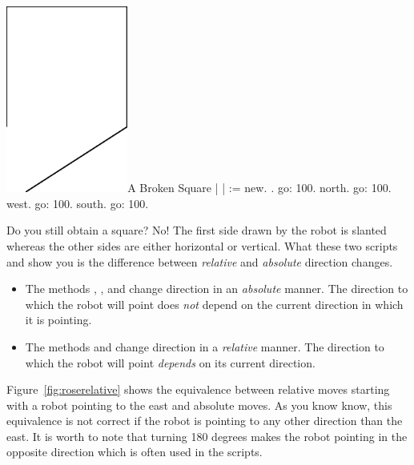 \begin{scriptfigwithsize}{\includegraphics[width=4cm]{ChTurnbadSquare}}{A Broken Square} \label{scr:badSquare}
| \caro |
\caro := \Turtle new.
\textit{\caro {}.}
\caro go: 100.
\caro north.
\caro go: 100.
\caro west.
\caro go: 100.
\caro south.
\caro go: 100.
\end{scriptfigwithsize}

Do you still obtain a square? No! The first side drawn by the robot
is slanted whereas the other sides are either horizontal or
vertical. What these two scripts  and
 show you is the difference between
\emph{relative} and \emph{absolute} direction changes.

\begin{itemize}
\item The methods \north, \south, \east and \west change direction in an  \emph{absolute} manner.  The direction to which the robot will point does \emph{not} depend on the current direction in which it is pointing.

\item The methods \turnLeft and \turnRight change direction in a \emph{relative} manner. The direction to which the robot will point \emph{depends} on its current direction.
\end{itemize}

Figure~\ref{fig:roserelative} shows the equivalence between relative moves starting with a robot pointing to the east and absolute moves. As you know know, this equivalence is not correct if the robot is pointing to any other direction than the east. It is worth to note that turning 180 degrees makes the robot pointing in the opposite direction which is often used in the scripts.

